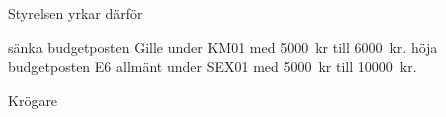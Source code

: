 \documentclass[../_main/handlingar.tex]{subfiles}
\begin{document}
Styrelsen yrkar därför 
\begin{attsatser}
    \att sänka budgetposten Gille under KM01 med \SI{5000}{kr} till \SI{6000}{kr}.
    \att höja budgetposten E6 allmänt under SEX01 med \SI{5000}{kr} till \SI{10000}{kr}. 
\end{attsatser}

\begin{signatures}{1}
    \ist
    \signature{\krog}{Krögare}
\end{signatures}
\end{document}

